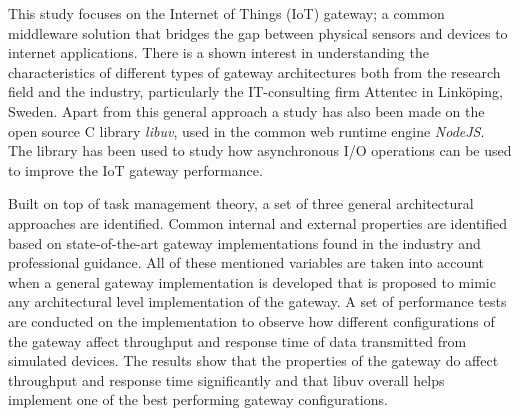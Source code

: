 This study focuses on the Internet of Things (IoT) gateway; a common middleware
solution that bridges the gap between physical sensors and devices to internet
applications. There is a shown interest in understanding the characteristics of
different types of gateway architectures both from the research field and the
industry, particularly the IT-consulting firm Attentec in Linköping, Sweden.
Apart from this general approach a study has also been made on the open source
C library \textit{libuv}, used in the common web runtime engine
\textit{NodeJS}. The library has been used to study how asynchronous I/O
operations can be used to improve the IoT gateway performance.

Built on top of task management theory, a set of three general architectural
approaches are identified. Common internal and external properties are
identified based on state-of-the-art gateway implementations found in the
industry and professional guidance. All of these mentioned variables are taken
into account when a general gateway implementation is developed that is
proposed to mimic any architectural level implementation of the gateway. A set
of performance tests are conducted on the implementation to observe how
different configurations of the gateway affect throughput and response time of
data transmitted from simulated devices. The results show that the properties
of the gateway do affect throughput and response time significantly and that
libuv overall helps implement one of the best performing gateway
configurations.

